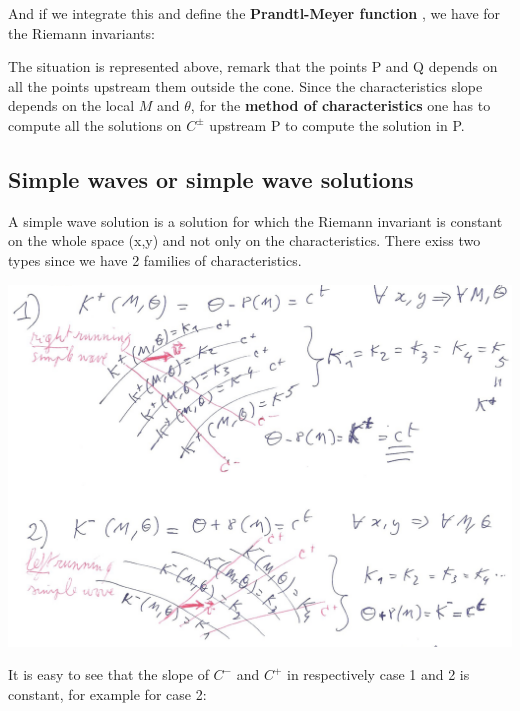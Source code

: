 	And if we integrate this and define the \textbf{Prandtl-Meyer function} , we have for the Riemann invariants: 
	
	\begin{center}
	\end{center}
	
	
	The situation is represented above, remark that the points P and Q depends on all the points upstream them outside the cone. Since the characteristics slope depends on the local $M$ and $\theta$,  for the \textbf{method of characteristics} one has to compute all the solutions on $C^\pm$ upstream P to compute the solution in P. 
	
\subsection{Simple waves or simple wave solutions}
	A simple wave solution is a solution for which the Riemann invariant is constant on the whole space (x,y)	and not only on the characteristics. There exiss two types since we have 2 families of characteristics. 
	
	\begin{center}
	\includegraphics[scale=0.15]{ch8/21}
	\end{center}
	
	It is easy to see that the slope of $C^-$ and $C^+$ in respectively case 1 and 2 is constant, for example for case 2: 
	
